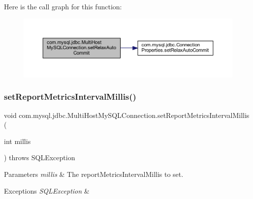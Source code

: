 Here is the call graph for this function\+:
\nopagebreak
\begin{figure}[H]
\begin{center}
\leavevmode
\includegraphics[width=350pt]{classcom_1_1mysql_1_1jdbc_1_1_multi_host_my_s_q_l_connection_adb974ee9a13de24aeadca3f29dc01549_cgraph}
\end{center}
\end{figure}
\mbox{\label{classcom_1_1mysql_1_1jdbc_1_1_multi_host_my_s_q_l_connection_a5b8ccf72b52a8a23618696f6167bbf89}} 
\subsubsection{\texorpdfstring{set\+Report\+Metrics\+Interval\+Millis()}{setReportMetricsIntervalMillis()}}
{\footnotesize\ttfamily void com.\+mysql.\+jdbc.\+Multi\+Host\+My\+S\+Q\+L\+Connection.\+set\+Report\+Metrics\+Interval\+Millis (\begin{DoxyParamCaption}\item[{int}]{millis }\end{DoxyParamCaption}) throws S\+Q\+L\+Exception}


\begin{DoxyParams}{Parameters}
{\em millis} & The report\+Metrics\+Interval\+Millis to set. \\
\hline
\end{DoxyParams}

\begin{DoxyExceptions}{Exceptions}
{\em S\+Q\+L\+Exception} & \\
\hline
\end{DoxyExceptions}


